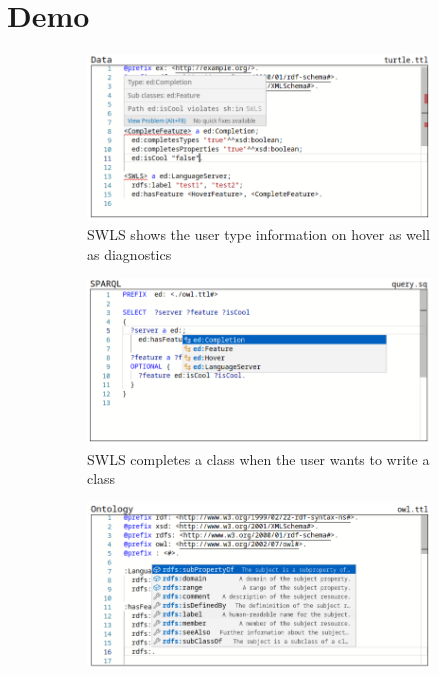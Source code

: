 \section{Demo}
\renewcommand{\textfloatsep}{5pt}  %
\begin{figure}[tb]
    \centering
    \begin{subfigure}{0.48\textwidth}
      \includegraphics[width=\textwidth]{./images/hover.png}
      \caption{SWLS shows the user type information on hover as well as diagnostics}
      \label{hover}
    \end{subfigure}
    \hfill
    \begin{subfigure}{0.48\textwidth}
      \includegraphics[width=\textwidth]{./images/class.png}
      \caption{SWLS completes a class when the user wants to write a class}
      \label{class_completion}
    \end{subfigure}
    \hfill
    \begin{subfigure}{0.48\textwidth}
      \includegraphics[width=\textwidth]{./images/property.png}

\end{subfigure}
\end{figure}

